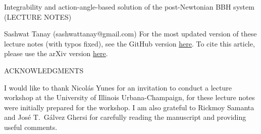 \documentclass[12pt]{report}
\begin{document}
\begin{titlepage}


\begin{center}
{\Large Integrability and action-angle-based solution of the post-Newtonian BBH system}\\
(LECTURE NOTES)\\
\end{center}
\begin{center}
Sashwat Tanay (sashwattanay@gmail.com)
\linebreak
\linebreak
\linebreak
\linebreak
\linebreak
For the most updated version of these lecture notes (with typos fixed), 
see the GitHub version \href{https://github.com/sashwattanay/lectures_integrability_action-angles_PN_BBH/blob/gh-action-result/pdflatex/lecture_notes/main.pdf}{here}.
To cite this article, please use the arXiv version 
\href{https://arxiv.org/abs/2206.05799}{here}.
\end{center}
\newpage
\begin{center}
{\Large ACKNOWLEDGMENTS}\linebreak
\linebreak
\end{center}
I would like to thank
Nicol\'as Yunes for an invitation to conduct a lecture workshop 
at the University of Illinois Urbana-Champaign, for
these lecture notes were initially prepared for the workshop.
I am also grateful to Rickmoy Samanta
and Jos\'e T.~G\'alvez Ghersi
for carefully reading the manuscript
and providing useful comments.
\end{titlepage}



\tableofcontents















\end{document}

